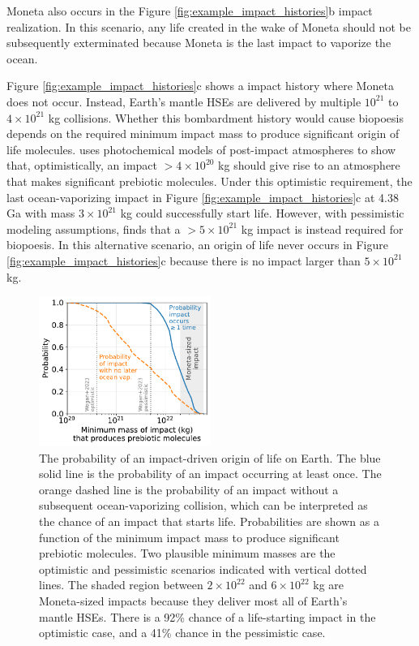 \documentclass[preprint]{aastex63}
\begin{document}
Moneta also occurs in the Figure \ref{fig:example_impact_histories}b impact realization. In this scenario, any life created in the wake of Moneta should not be subsequently exterminated because Moneta is the last impact to vaporize the ocean.

Figure \ref{fig:example_impact_histories}c shows a impact history where Moneta does not occur. Instead, Earth's mantle HSEs are delivered by multiple $10^{21}$ to $4 \times 10^{21}$ kg collisions. Whether this bombardment history would cause biopoesis depends on the required minimum impact mass to produce significant origin of life molecules. \citet{Wogan_2023} uses photochemical models of post-impact atmospheres to show that, optimistically, an impact $> 4 \times 10^{20}$ kg should give rise to an atmosphere that makes significant prebiotic molecules. Under this optimistic requirement, the last ocean-vaporizing impact in Figure \ref{fig:example_impact_histories}c at 4.38 Ga with mass $3 \times 10^{21}$ kg could successfully start life. However, with pessimistic modeling assumptions, \citet{Wogan_2023} finds that a $> 5 \times 10^{21}$ kg impact is instead required for biopoesis. In this alternative scenario, an origin of life never occurs in Figure \ref{fig:example_impact_histories}c because there is no impact larger than $5 \times 10^{21}$ kg.

\begin{figure}
  \centering
  \includegraphics[width=0.5\textwidth]{figures/probabilities_of_impacts.pdf}
  \caption{The probability of an impact-driven origin of life on Earth. The blue solid line is the probability of an impact occurring at least once. The orange dashed line is the probability of an impact without a subsequent ocean-vaporizing collision, which can be interpreted as the chance of an impact that starts life. Probabilities are shown as a function of the minimum impact mass to produce significant prebiotic molecules. Two plausible minimum masses are the \citet{Wogan_2023} optimistic and pessimistic scenarios indicated with vertical dotted lines. The shaded region between $2 \times 10^{22}$ and $6 \times 10^{22}$ kg are Moneta-sized impacts because they deliver most all of Earth's mantle HSEs. There is a 92\% chance of a life-starting impact in the \citet{Wogan_2023} optimistic case, and a 41\% chance in the pessimistic case.}
  \label{fig:probabilities_of_impacts}
\end{figure}
\end{document}
